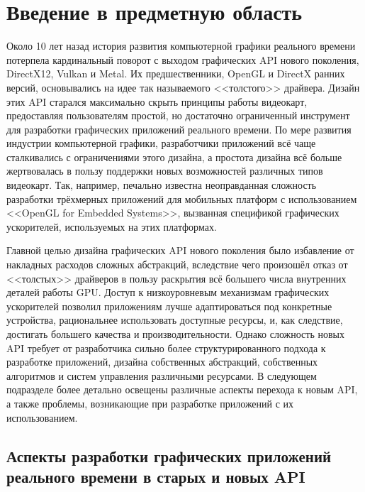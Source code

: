 \section{Введение в предметную область}
Около 10 лет назад история развития компьютерной графики реального времени потерпела кардинальный поворот с выходом графических API нового поколения, DirectX12, Vulkan и Metal.
Их предшественники, OpenGL и DirectX ранних версий, основывались на идее так называемого <<толстого>> драйвера.
Дизайн этих API старался максимально скрыть принципы работы видеокарт, предоставляя пользователям простой, но достаточно ограниченный инструмент для разработки графических приложений реального времени.
По мере развития индустрии компьютерной графики, разработчики приложений всё чаще сталкивались с ограничениями этого дизайна, а простота дизайна всё больше жертвовалась в пользу поддержки новых возможностей различных типов видеокарт.
Так, например, печально известна неоправданная сложность разработки трёхмерных приложений для мобильных платформ с использованием <<OpenGL for Embedded Systems>>, вызванная спецификой графических ускорителей, используемых на этих платформах.

Главной целью дизайна графических API нового поколения было избавление от накладных расходов сложных абстракций, вследствие чего произошёл отказ от <<толстых>> драйверов в пользу раскрытия всё большего числа внутренних деталей работы GPU.
Доступ к низкоуровневым механизмам графических ускорителей позволил приложениям лучше адаптироваться под конкретные устройства, рациональнее использовать доступные ресурсы, и, как следствие, достигать большего качества и производительности.
Однако сложность новых API требует от разработчика сильно более структурированного подхода к разработке приложений, дизайна собственных абстракций, собственных алгоритмов и систем управления различными ресурсами.
В следующем подразделе более детально освещены различные аспекты перехода к новым API, а также проблемы, возникающие при разработке приложений с их использованием.

\subsection{Аспекты разработки графических приложений реального времени в старых и новых API}
